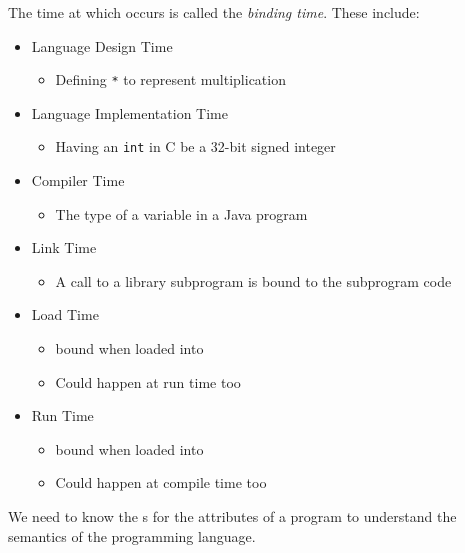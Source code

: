 \begin{definition}\label{def:Binding_Time}
  The time at which  occurs is called the \emph{binding time}.
  These include:
  \begin{itemize}[noitemsep]
  \item Language Design Time
    \begin{itemize}[noitemsep]
    \item Defining \texttt{*} to represent multiplication
    \end{itemize}
  \item Language Implementation Time
    \begin{itemize}[noitemsep]
    \item Having an \texttt{int} in C be a 32-bit signed integer
    \end{itemize}
  \item Compiler Time
    \begin{itemize}[noitemsep]
    \item The type of a variable in a Java program
    \end{itemize}
  \item Link Time
    \begin{itemize}[noitemsep]
    \item A call to a library subprogram is bound to the subprogram code
    \end{itemize}
  \item Load Time
    \begin{itemize}[noitemsep]
    \item {} bound when loaded into 
    \item Could happen at run time too
    \end{itemize}
  \item Run Time
    \begin{itemize}[noitemsep]
    \item {} bound when loaded into 
    \item Could happen at compile time too
    \end{itemize}
  \end{itemize}
\end{definition}

We need to know the s for the attributes of a program to understand the semantics of the programming language.

